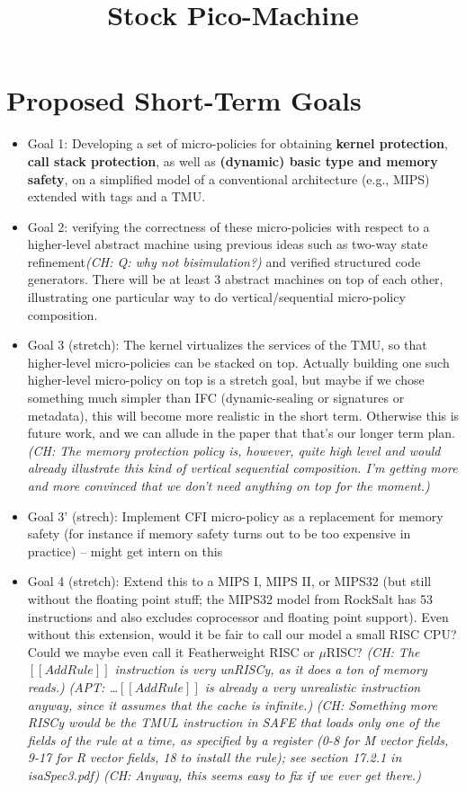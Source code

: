 \documentclass{article}
\newcommand{\ch}[1]{{\color{dkblue}\em (CH: #1)}}
\newcommand{\apt}[1]{{\color{red}\em (APT: #1)}}
\newcommand*{\EG}{e.g.,\xspace}
\begin{document}
\title{Stock Pico-Machine}
\maketitle

\section{Proposed Short-Term Goals}

\begin{itemize}
\item Goal 1: Developing a set of micro-policies for obtaining {\bf
    kernel protection}, {\bf call stack protection}, as well as {\bf
    (dynamic) basic type and memory safety}, on a simplified model of
  a conventional architecture (\EG MIPS) extended with tags and a TMU.
\item Goal 2: verifying the correctness of these micro-policies with
  respect to a higher-level abstract machine using previous ideas such
  as two-way state refinement\ch{Q: why not bisimulation?} and verified
  structured code generators. There will be at least 3 abstract
  machines on top of each other, illustrating one particular way to do
  vertical/sequential micro-policy composition.
\item Goal 3 (stretch): The kernel virtualizes the services
  of the TMU, so that higher-level micro-policies can be stacked
  on top. Actually building one such higher-level micro-policy on top
  is a stretch goal,
  but maybe if we chose something much simpler than IFC
  (dynamic-sealing or signatures or metadata), this will become more
  realistic in the short term. Otherwise this is future work, and we
  can allude in the paper that that's our longer term plan.
  \ch{The memory protection policy is, however, quite high level
      and would already illustrate this kind of vertical sequential
      composition. I'm getting more and more convinced that we don't
      need anything on top for the moment.}
\item Goal 3' (strech): Implement CFI micro-policy as a replacement
  for memory safety (for instance if memory safety turns out to be too
  expensive in practice) -- might get intern on this
\item Goal 4 (stretch): Extend this to a MIPS I, MIPS II, or MIPS32
  (but still without the floating point stuff; the MIPS32 model
  from RockSalt has 53 instructions and also excludes coprocessor and
  floating point support). Even without this
  extension, would it be fair to call our model a small RISC CPU?
  Could we maybe even call it Featherweight RISC or $\mu$RISC?
  \ch{The $[[AddRule]]$ instruction is very unRISCy, as it
    does a ton of memory reads.} \apt{\ldots $[[AddRule]]$ is already
    a very unrealistic instruction anyway, since it assumes that the 
    cache is infinite.}
  \ch{Something more RISCy would be the TMUL instruction in SAFE that
    loads only one of the fields of the rule at a time, as specified
    by a register (0-8 for M vector fields, 9-17 for R vector fields,
    18 to install the rule); see section 17.2.1 in isaSpec3.pdf}
  \ch{Anyway, this seems easy to fix if we ever get there.}


\end{itemize}
\end{document}
